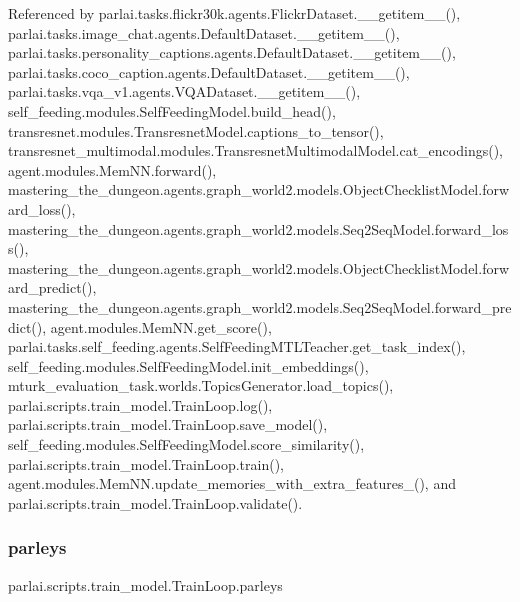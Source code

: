Referenced by parlai.\+tasks.\+flickr30k.\+agents.\+Flickr\+Dataset.\+\_\+\+\_\+getitem\+\_\+\+\_\+(), parlai.\+tasks.\+image\+\_\+chat.\+agents.\+Default\+Dataset.\+\_\+\+\_\+getitem\+\_\+\+\_\+(), parlai.\+tasks.\+personality\+\_\+captions.\+agents.\+Default\+Dataset.\+\_\+\+\_\+getitem\+\_\+\+\_\+(), parlai.\+tasks.\+coco\+\_\+caption.\+agents.\+Default\+Dataset.\+\_\+\+\_\+getitem\+\_\+\+\_\+(), parlai.\+tasks.\+vqa\+\_\+v1.\+agents.\+V\+Q\+A\+Dataset.\+\_\+\+\_\+getitem\+\_\+\+\_\+(), self\+\_\+feeding.\+modules.\+Self\+Feeding\+Model.\+build\+\_\+head(), transresnet.\+modules.\+Transresnet\+Model.\+captions\+\_\+to\+\_\+tensor(), transresnet\+\_\+multimodal.\+modules.\+Transresnet\+Multimodal\+Model.\+cat\+\_\+encodings(), agent.\+modules.\+Mem\+N\+N.\+forward(), mastering\+\_\+the\+\_\+dungeon.\+agents.\+graph\+\_\+world2.\+models.\+Object\+Checklist\+Model.\+forward\+\_\+loss(), mastering\+\_\+the\+\_\+dungeon.\+agents.\+graph\+\_\+world2.\+models.\+Seq2\+Seq\+Model.\+forward\+\_\+loss(), mastering\+\_\+the\+\_\+dungeon.\+agents.\+graph\+\_\+world2.\+models.\+Object\+Checklist\+Model.\+forward\+\_\+predict(), mastering\+\_\+the\+\_\+dungeon.\+agents.\+graph\+\_\+world2.\+models.\+Seq2\+Seq\+Model.\+forward\+\_\+predict(), agent.\+modules.\+Mem\+N\+N.\+get\+\_\+score(), parlai.\+tasks.\+self\+\_\+feeding.\+agents.\+Self\+Feeding\+M\+T\+L\+Teacher.\+get\+\_\+task\+\_\+index(), self\+\_\+feeding.\+modules.\+Self\+Feeding\+Model.\+init\+\_\+embeddings(), mturk\+\_\+evaluation\+\_\+task.\+worlds.\+Topics\+Generator.\+load\+\_\+topics(), parlai.\+scripts.\+train\+\_\+model.\+Train\+Loop.\+log(), parlai.\+scripts.\+train\+\_\+model.\+Train\+Loop.\+save\+\_\+model(), self\+\_\+feeding.\+modules.\+Self\+Feeding\+Model.\+score\+\_\+similarity(), parlai.\+scripts.\+train\+\_\+model.\+Train\+Loop.\+train(), agent.\+modules.\+Mem\+N\+N.\+update\+\_\+memories\+\_\+with\+\_\+extra\+\_\+features\+\_\+(), and parlai.\+scripts.\+train\+\_\+model.\+Train\+Loop.\+validate().

\mbox{\label{classparlai_1_1scripts_1_1train__model_1_1TrainLoop_abd0cf79ef34f6ef8f028f7fa44eae971}} 
\subsubsection{\texorpdfstring{parleys}{parleys}}
{\footnotesize\ttfamily parlai.\+scripts.\+train\+\_\+model.\+Train\+Loop.\+parleys}



